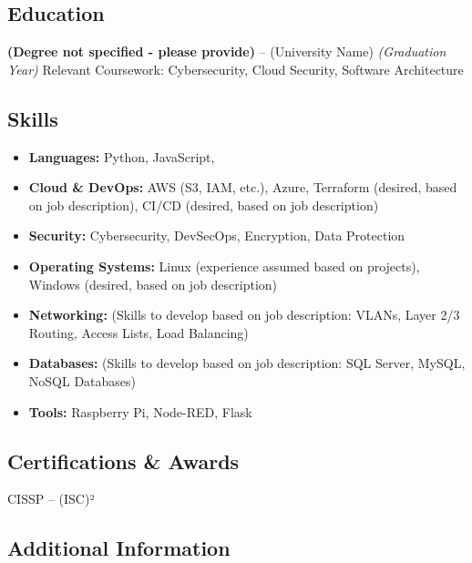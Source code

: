 \documentclass[
]{article}
\providecommand{\tightlist}{%
  \setlength{\itemsep}{0pt}\setlength{\parskip}{0pt}}
\begin{document}
\subsection{\texorpdfstring{\textbf{Education}}{Education}}\label{education}

\textbf{(Degree not specified - please provide)} -- (University Name)
\emph{(Graduation Year)} Relevant Coursework: Cybersecurity, Cloud
Security, Software Architecture

\subsection{\texorpdfstring{\textbf{Skills}}{Skills}}\label{skills}

\begin{itemize}
\tightlist
\item
  \textbf{Languages:} Python, JavaScript,\\
\item
  \textbf{Cloud \& DevOps:} AWS (S3, IAM, etc.), Azure, Terraform
  (desired, based on job description), CI/CD (desired, based on job
  description)
\item
  \textbf{Security:} Cybersecurity, DevSecOps, Encryption, Data
  Protection
\item
  \textbf{Operating Systems:} Linux (experience assumed based on
  projects), Windows (desired, based on job description)
\item
  \textbf{Networking:} (Skills to develop based on job description:
  VLANs, Layer 2/3 Routing, Access Lists, Load Balancing)
\item
  \textbf{Databases:} (Skills to develop based on job description: SQL
  Server, MySQL, NoSQL Databases)
\item
  \textbf{Tools:} Raspberry Pi, Node-RED, Flask
\end{itemize}

\subsection{\texorpdfstring{\textbf{Certifications \&
Awards}}{Certifications \& Awards}}\label{certifications-awards}

CISSP -- (ISC)²

\subsection{\texorpdfstring{\textbf{Additional
Information}}{Additional Information}}\label{additional-information}
\end{document}

